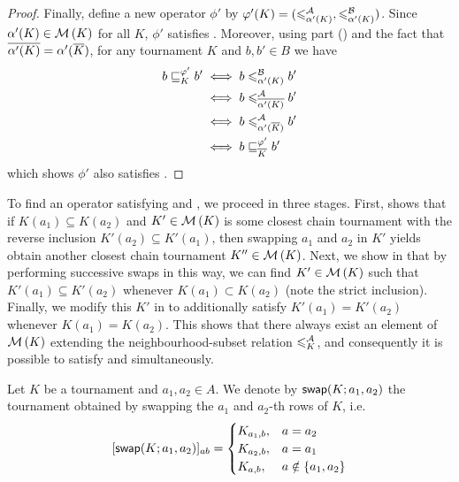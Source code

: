 \begin{proof}
    Finally, define a new operator $\phi'$ by $\varphi'(K) =
    ({\leqslant^{\mathcal{A}}_{\alpha'(K)}}, {\leqslant^{\mathcal{B}}_{\alpha'(K)}})$. Since $\alpha'(K) \in
    \operatorname{\mathcal{M}}\left({K}\right)$ for all $K$, $\phi'$ satisfies \chainmin{}. Moreover,
    using  part
    () and the fact that ${\overline{\alpha'(K)}} =
    \alpha'({\overline{K}})$, for any tournament $K$ and $b, b' \in B$ we have
    \begin{align*}
        b \sqsubseteq_K^{\varphi'} b'
        &\iff b \leqslant^{\mathcal{B}}_{\alpha'(K)} b' \\
        &\iff b \leqslant^{\mathcal{A}}_{{\overline{\alpha'(K)}}} b' \\
        &\iff b \leqslant^{\mathcal{A}}_{\alpha'({\overline{K}})} b' \\
        &\iff b \sqsubseteq_{{\overline{K}}}^{\varphi'} b'
    \end{align*}
    which shows $\phi'$ also satisfies \dualaxiom{}.
\end{proof}

To find an operator satisfying \chainmin{} and \mon{}, we
proceed in three stages. First,  shows
that if $K(a_1) \subseteq K(a_2)$ and $K' \in \operatorname{\mathcal{M}}\left({K}\right)$ is some closest chain
tournament with the reverse inclusion $K'(a_2) \subseteq K'(a_1)$, then
swapping $a_1$ and $a_2$ in $K'$ yields obtain another closest chain tournament
$K'' \in \operatorname{\mathcal{M}}\left({K}\right)$. Next, we show in
 that by performing
successive swaps in this way, we can find $K' \in \operatorname{\mathcal{M}}\left({K}\right)$ such that $K'(a_1)
\subseteq K'(a_2)$ whenever $K(a_1) \subset K(a_2)$ (note the strict
inclusion). Finally, we modify this $K'$ in
 to additionally satisfy $K'(a_1) =
K'(a_2)$ whenever $K(a_1) = K(a_2)$.  This shows that there always exist an
element of $\operatorname{\mathcal{M}}\left({K}\right)$ extending the neighbourhood-subset relation $\leqslant^{\mathcal{A}}_K$,
and consequently it is possible to satisfy \chainmin{} and
\mon{} simultaneously.

\begin{definition}
    Let $K$ be a tournament and $a_1, a_2 \in A$. We denote by
    $\mathsf{swap}({K}; {a_1}, {a_2})$ the tournament obtained by swapping the $a_1$ and
    $a_2$-th rows of $K$, i.e.
    \[
        [\mathsf{swap}({K}; {a_1}, {a_2})]_{ab} = \begin{cases}
            K_{a_1,b},& a = a_2 \\
            K_{a_2,b},& a = a_1 \\
            K_{a,b},& a \notin \{a_1,a_2\}
        \end{cases}
    \]
\end{definition}

